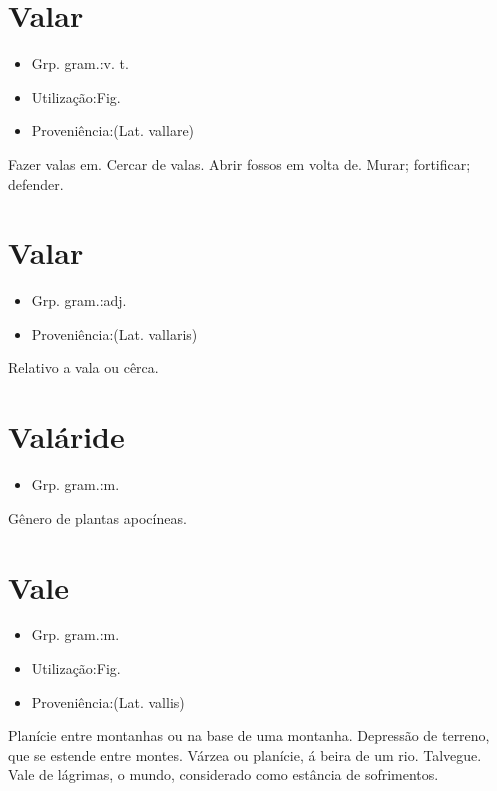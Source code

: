 \documentclass{article}
\begin{document}
\section{Valar}
\begin{itemize}
\item {Grp. gram.:v. t.}
\end{itemize}
\begin{itemize}
\item {Utilização:Fig.}
\end{itemize}
\begin{itemize}
\item {Proveniência:(Lat. \textunderscore vallare\textunderscore )}
\end{itemize}
Fazer valas em.
Cercar de valas.
Abrir fossos em volta de.
Murar; fortificar; defender.
\section{Valar}
\begin{itemize}
\item {Grp. gram.:adj.}
\end{itemize}
\begin{itemize}
\item {Proveniência:(Lat. \textunderscore vallaris\textunderscore )}
\end{itemize}
Relativo a vala ou cêrca.
\section{Valáride}
\begin{itemize}
\item {Grp. gram.:m.}
\end{itemize}
Gênero de plantas apocíneas.
\section{Vale}
\begin{itemize}
\item {Grp. gram.:m.}
\end{itemize}
\begin{itemize}
\item {Utilização:Fig.}
\end{itemize}
\begin{itemize}
\item {Proveniência:(Lat. \textunderscore vallis\textunderscore )}
\end{itemize}
Planície entre montanhas ou na base de uma montanha.
Depressão de terreno, que se estende entre montes.
Várzea ou planície, á beira de um rio.
Talvegue.
\textunderscore Vale de lágrimas\textunderscore , o mundo, considerado como estância de sofrimentos.
\end{document}
